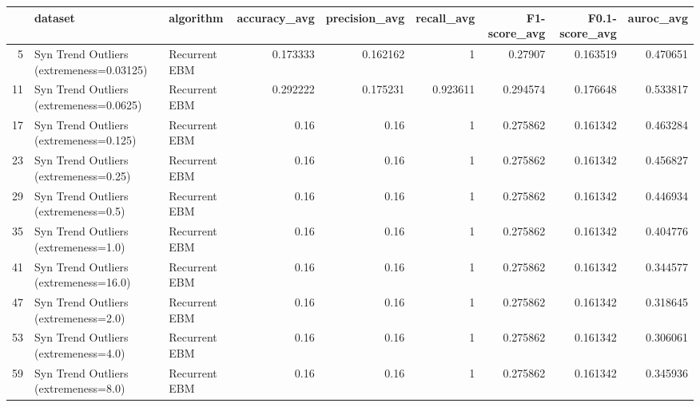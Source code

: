 \begin{tabular}{rllrrrrrr}
\hline
    & dataset                                  & algorithm     &   accuracy\_avg &   precision\_avg &   recall\_avg &   F1-score\_avg &   F0.1-score\_avg &   auroc\_avg \\
\hline
  5 & Syn Trend Outliers (extremeness=0.03125) & Recurrent EBM &       0.173333 &        0.162162 &     1        &       0.27907  &         0.163519 &    0.470651 \\
 11 & Syn Trend Outliers (extremeness=0.0625)  & Recurrent EBM &       0.292222 &        0.175231 &     0.923611 &       0.294574 &         0.176648 &    0.533817 \\
 17 & Syn Trend Outliers (extremeness=0.125)   & Recurrent EBM &       0.16     &        0.16     &     1        &       0.275862 &         0.161342 &    0.463284 \\
 23 & Syn Trend Outliers (extremeness=0.25)    & Recurrent EBM &       0.16     &        0.16     &     1        &       0.275862 &         0.161342 &    0.456827 \\
 29 & Syn Trend Outliers (extremeness=0.5)     & Recurrent EBM &       0.16     &        0.16     &     1        &       0.275862 &         0.161342 &    0.446934 \\
 35 & Syn Trend Outliers (extremeness=1.0)     & Recurrent EBM &       0.16     &        0.16     &     1        &       0.275862 &         0.161342 &    0.404776 \\
 41 & Syn Trend Outliers (extremeness=16.0)    & Recurrent EBM &       0.16     &        0.16     &     1        &       0.275862 &         0.161342 &    0.344577 \\
 47 & Syn Trend Outliers (extremeness=2.0)     & Recurrent EBM &       0.16     &        0.16     &     1        &       0.275862 &         0.161342 &    0.318645 \\
 53 & Syn Trend Outliers (extremeness=4.0)     & Recurrent EBM &       0.16     &        0.16     &     1        &       0.275862 &         0.161342 &    0.306061 \\
 59 & Syn Trend Outliers (extremeness=8.0)     & Recurrent EBM &       0.16     &        0.16     &     1        &       0.275862 &         0.161342 &    0.345936 \\
\hline
\end{tabular}

